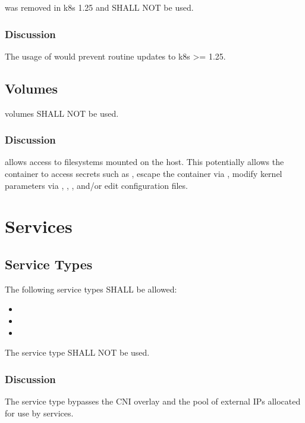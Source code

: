 \documentclass[PMO,authoryear,toc]{lsstdoc}
\begin{document}
 was removed in k8s 1.25 and SHALL NOT be used.

\subsubsection{Discussion}

The usage of  would prevent routine updates to k8s >= 1.25.

\subsection{ Volumes}

 volumes SHALL NOT be used.

\subsubsection{Discussion}

 allows access to filesystems mounted on the host. This potentially allows the container to access secrets such as , escape the container via , modify kernel parameters via , , , and/or edit configuration files.

\section{Services}\label{sec:svc}

\subsection{Service Types}

The following service types SHALL be allowed:

\begin{itemize}
  \item {}
  \item {}
  \item {}
\end{itemize}

The  service type SHALL NOT be used.

\subsubsection{Discussion}

The  service type bypasses the CNI overlay and the pool of external IPs allocated for use by  services.
\end{document}

